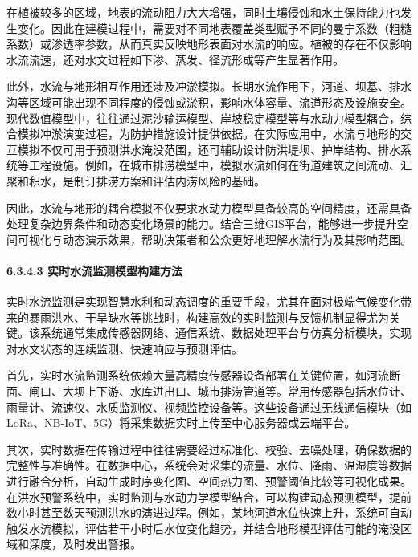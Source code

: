 在植被较多的区域，地表的流动阻力大大增强，同时土壤侵蚀和水土保持能力也发生变化。因此在建模过程中，需要对不同地表覆盖类型赋予不同的曼宁系数（粗糙系数）或渗透率参数，从而真实反映地形表面对水流的响应。植被的存在不仅影响水流流速，还对水文过程如下渗、蒸发、径流形成等产生显著作用。

此外，水流与地形相互作用还涉及冲淤模拟。长期水流作用下，河道、坝基、排水沟等区域可能出现不同程度的侵蚀或淤积，影响水体容量、流道形态及设施安全。现代数值模型中，往往通过泥沙输运模型、岸坡稳定模型等与水动力模型耦合，综合模拟冲淤演变过程，为防护措施设计提供依据。在实际应用中，水流与地形的交互模拟不仅可用于预测洪水淹没范围，还可辅助设计防洪堤坝、护岸结构、排水系统等工程设施。例如，在城市排涝模型中，模拟水流如何在街道建筑之间流动、汇聚和积水，是制订排涝方案和评估内涝风险的基础。

因此，水流与地形的耦合模拟不仅要求水动力模型具备较高的空间精度，还需具备处理复杂边界条件和动态变化场景的能力。结合三维GIS平台，能够进一步提升空间可视化与动态演示效果，帮助决策者和公众更好地理解水流行为及其影响范围。

\hypertarget{ux5b9eux65f6ux6c34ux6d41ux76d1ux6d4bux6a21ux578bux6784ux5efaux65b9ux6cd5}{%
\paragraph{6.3.4.3 实时水流监测模型构建方法}\label{ux5b9eux65f6ux6c34ux6d41ux76d1ux6d4bux6a21ux578bux6784ux5efaux65b9ux6cd5}}

实时水流监测是实现智慧水利和动态调度的重要手段，尤其在面对极端气候变化带来的暴雨洪水、干旱缺水等挑战时，构建高效的实时监测与反馈机制显得尤为关键。该系统通常集成传感器网络、通信系统、数据处理平台与仿真分析模块，实现对水文状态的连续监测、快速响应与预测评估。

首先，实时水流监测系统依赖大量高精度传感器设备部署在关键位置，如河流断面、闸口、大坝上下游、水库进出口、城市排涝管道等。常用传感器包括水位计、雨量计、流速仪、水质监测仪、视频监控设备等。这些设备通过无线通信模块（如LoRa、NB-IoT、5G）将采集数据实时上传至中心服务器或云端平台。

其次，实时数据在传输过程中往往需要经过标准化、校验、去噪处理，确保数据的完整性与准确性。在数据中心，系统会对采集的流量、水位、降雨、温湿度等数据进行融合分析，自动生成时序变化图、空间热力图、预警阈值比较等可视化成果。在洪水预警系统中，实时监测与水动力学模型结合，可以构建动态预测模型，提前数小时甚至数天预测洪水的演进过程。例如，某地河道水位快速上升，系统可自动触发水流模拟，评估若干小时后水位变化趋势，并结合地形模型评估可能的淹没区域和深度，及时发出警报。

